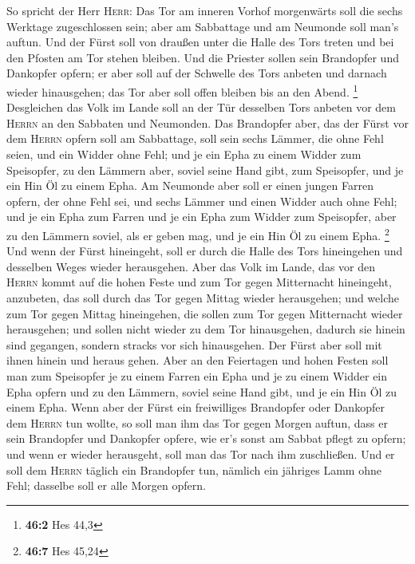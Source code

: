  So spricht der Herr \textsc{Herr}: Das Tor am inneren
Vorhof morgenwärts soll die sechs Werktage zugeschlossen sein; aber am
Sabbattage und am Neumonde soll man's auftun.  Und der
Fürst soll von draußen unter die Halle des Tors treten und bei den
Pfosten am Tor stehen bleiben. Und die Priester sollen sein Brandopfer
und Dankopfer opfern; er aber soll auf der Schwelle des Tors anbeten und
darnach wieder hinausgehen; das Tor aber soll offen bleiben bis an den
Abend. \footnote{\textbf{46:2} Hes 44,3}  Desgleichen das
Volk im Lande soll an der Tür desselben Tors anbeten vor dem
\textsc{Herrn} an den Sabbaten und Neumonden.  Das
Brandopfer aber, das der Fürst vor dem \textsc{Herrn} opfern soll am
Sabbattage, soll sein sechs Lämmer, die ohne Fehl seien, und ein Widder
ohne Fehl;  und je ein Epha zu einem Widder zum
Speisopfer, zu den Lämmern aber, soviel seine Hand gibt, zum Speisopfer,
und je ein Hin Öl zu einem Epha.  Am Neumonde aber soll er
einen jungen Farren opfern, der ohne Fehl sei, und sechs Lämmer und
einen Widder auch ohne Fehl;  und je ein Epha zum Farren
und je ein Epha zum Widder zum Speisopfer, aber zu den Lämmern soviel,
als er geben mag, und je ein Hin Öl zu einem Epha. \footnote{\textbf{46:7}
  Hes 45,24}  Und wenn der Fürst hineingeht, soll er durch
die Halle des Tors hineingehen und desselben Weges wieder herausgehen.
 Aber das Volk im Lande, das vor den \textsc{Herrn} kommt
auf die hohen Feste und zum Tor gegen Mitternacht hineingeht, anzubeten,
das soll durch das Tor gegen Mittag wieder herausgehen; und welche zum
Tor gegen Mittag hineingehen, die sollen zum Tor gegen Mitternacht
wieder herausgehen; und sollen nicht wieder zu dem Tor hinausgehen,
dadurch sie hinein sind gegangen, sondern stracks vor sich hinausgehen.
 Der Fürst aber soll mit ihnen hinein und heraus gehen.
 Aber an den Feiertagen und hohen Festen soll man zum
Speisopfer je zu einem Farren ein Epha und je zu einem Widder ein Epha
opfern und zu den Lämmern, soviel seine Hand gibt, und je ein Hin Öl zu
einem Epha.  Wenn aber der Fürst ein freiwilliges
Brandopfer oder Dankopfer dem \textsc{Herrn} tun wollte, so soll man ihm
das Tor gegen Morgen auftun, dass er sein Brandopfer und Dankopfer
opfere, wie er's sonst am Sabbat pflegt zu opfern; und wenn er wieder
herausgeht, soll man das Tor nach ihm zuschließen.  Und
er soll dem \textsc{Herrn} täglich ein Brandopfer tun, nämlich ein
jähriges Lamm ohne Fehl; dasselbe soll er alle Morgen opfern.
